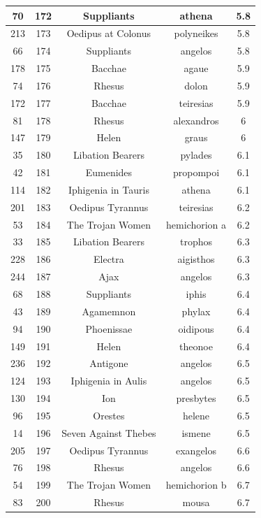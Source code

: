 \documentclass{jcls}
\begin{document}
\begin{longtable}{|c|c|c|c|c|}
  70 & 172 & Suppliants & athena & 5.8 \\ \hline
  213 & 173 & Oedipus at Colonus & polyneikes & 5.8 \\ \hline
  66 & 174 & Suppliants & angelos & 5.8 \\ \hline
  178 & 175 & Bacchae & agaue & 5.9 \\ \hline
  74 & 176 & Rhesus & dolon & 5.9 \\ \hline
  172 & 177 & Bacchae & teiresias & 5.9 \\ \hline
  81 & 178 & Rhesus & alexandros & 6 \\ \hline
  147 & 179 & Helen & graus & 6 \\ \hline
  35 & 180 & Libation Bearers & pylades & 6.1 \\ \hline
  42 & 181 & Eumenides & propompoi & 6.1 \\ \hline
  114 & 182 & Iphigenia in Tauris & athena & 6.1 \\ \hline
  201 & 183 & Oedipus Tyrannus & teiresias & 6.2 \\ \hline
  53 & 184 & The Trojan Women & hemichorion a & 6.2 \\ \hline
  33 & 185 & Libation Bearers & trophos & 6.3 \\ \hline
  228 & 186 & Electra & aigisthos & 6.3 \\ \hline
  244 & 187 & Ajax & angelos & 6.3 \\ \hline
  68 & 188 & Suppliants & iphis & 6.4 \\ \hline
  43 & 189 & Agamemnon & phylax & 6.4 \\ \hline
  94 & 190 & Phoenissae & oidipous & 6.4 \\ \hline
  149 & 191 & Helen & theonoe & 6.4 \\ \hline
  236 & 192 & Antigone & angelos & 6.5 \\ \hline
  124 & 193 & Iphigenia in Aulis & angelos & 6.5 \\ \hline
  130 & 194 & Ion & presbytes & 6.5 \\ \hline
  96 & 195 & Orestes & helene & 6.5 \\ \hline
  14 & 196 & Seven Against Thebes & ismene & 6.5 \\ \hline
  205 & 197 & Oedipus Tyrannus & exangelos & 6.6 \\ \hline
  76 & 198 & Rhesus & angelos & 6.6 \\ \hline
  54 & 199 & The Trojan Women & hemichorion b & 6.7 \\ \hline
  83 & 200 & Rhesus & mousa & 6.7 \\ \hline

\end{longtable}
\end{document}
